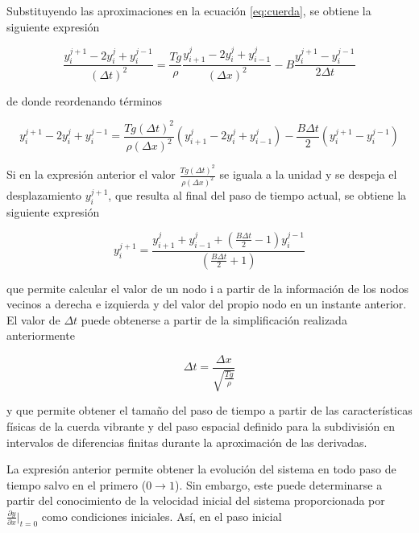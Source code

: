 \documentclass[11pt]{article}
\begin{document}
Substituyendo las aproximaciones en la ecuación \ref{eq:cuerda}, se obtiene la siguiente
expresión

\begin{equation}
\frac{y^{j+1}_i - 2y^j_i + y^{j-1}_i}{(\Delta{t})^2} = 
	\frac{Tg}{\rho}\frac{y^j_{i+1} - 2y^j_i + y^j_{i-1}}{(\Delta{x})^2}
	- B \frac{y^{j+1}_i - y^{j-1}_i}{2\Delta{t}}
\end{equation}

de donde reordenando términos 

\begin{equation}
y^{j+1}_{i} - 2y^{j}_i + y^{j-1}_i = \frac{Tg(\Delta{t})^2}{\rho(\Delta{x})^2}
	(y^j_{i+1} - 2y^j_i + y^j_{i-1}) - \frac{B\Delta{t}}{2}(y^{j+1}_i - y^{j-1}_i)
\label{eq:aproximacion}
\end{equation}

Si en la expresión anterior el valor $\frac{Tg(\Delta{t})^2}{\rho(\Delta{x})^2}$ se iguala
a la unidad y se despeja el desplazamiento $y^{j+1}_i$, que resulta al final del paso de
tiempo actual, se obtiene la siguiente expresión

\begin{equation}
y^{j+1}_i = \frac{y^j_{i+1} + y^j_{i-1} + (\frac{B\Delta{t}}{2} - 1)y^{j-1}_i}{(\frac{B\Delta{t}}{2} + 1)}
\label{eq:pasos_siguientes}
\end{equation}

que permite calcular el valor de un nodo i a partir de la información de los nodos vecinos
a derecha e izquierda y del valor del propio nodo en un instante anterior. El valor de 
$\Delta{t}$ puede obtenerse a partir de la simplificación realizada anteriormente 

\begin{equation}
\Delta{t} = \frac{\Delta{x}}{\sqrt{\frac{Tg}{\rho}}}
\label{eq:paso_tiempo}
\end{equation}

y que permite obtener el tamaño del paso de tiempo a partir de las características físicas
de la cuerda vibrante y del paso espacial definido para la subdivisión en intervalos de
diferencias finitas durante la aproximación de las derivadas.

La expresión anterior permite obtener la evolución del sistema en todo paso de tiempo
salvo en el primero ($0 \rightarrow 1$). Sin embargo, este puede determinarse a partir del 
conocimiento de la velocidad inicial del sistema proporcionada por 
$\frac{\partial{y}}{\partial{x}}|_{t=0}$ como condiciones iniciales. Así, en el paso
inicial
\end{document}
